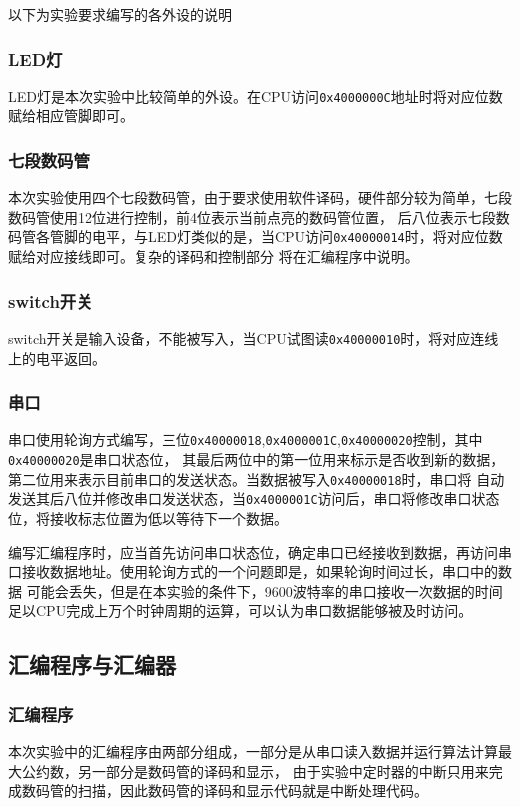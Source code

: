 \documentclass{ctexart}
\begin{document}
以下为实验要求编写的各外设的说明

			\subsubsection{LED灯}
			LED灯是本次实验中比较简单的外设。在CPU访问\verb"0x4000000C"地址时将对应位数赋给相应管脚即可。
			\subsubsection{七段数码管}
			本次实验使用四个七段数码管，由于要求使用软件译码，硬件部分较为简单，七段数码管使用12位进行控制，前4位表示当前点亮的数码管位置，
			后八位表示七段数码管各管脚的电平，与LED灯类似的是，当CPU访问\verb"0x40000014"时，将对应位数赋给对应接线即可。复杂的译码和控制部分
			将在汇编程序中说明。
			\subsubsection{switch开关}
			switch开关是输入设备，不能被写入，当CPU试图读\verb"0x40000010"时，将对应连线上的电平返回。
			\subsubsection{串口}
			
			串口使用轮询方式编写，三位\verb"0x40000018",\verb"0x4000001C",\verb"0x40000020"控制，其中\verb"0x40000020"是串口状态位，
			其最后两位中的第一位用来标示是否收到新的数据，第二位用来表示目前串口的发送状态。当数据被写入\verb"0x40000018"时，串口将
			自动发送其后八位并修改串口发送状态，当\verb"0x4000001C"访问后，串口将修改串口状态位，将接收标志位置为低以等待下一个数据。

			编写汇编程序时，应当首先访问串口状态位，确定串口已经接收到数据，再访问串口接收数据地址。使用轮询方式的一个问题即是，如果轮询时间过长，串口中的数据
			可能会丢失，但是在本实验的条件下，9600波特率的串口接收一次数据的时间足以CPU完成上万个时钟周期的运算，可以认为串口数据能够被及时访问。


		\subsection{汇编程序与汇编器}
		\subsubsection{汇编程序}
			本次实验中的汇编程序由两部分组成，一部分是从串口读入数据并运行算法计算最大公约数，另一部分是数码管的译码和显示，
			由于实验中定时器的中断只用来完成数码管的扫描，因此数码管的译码和显示代码就是中断处理代码。
\end{document}

